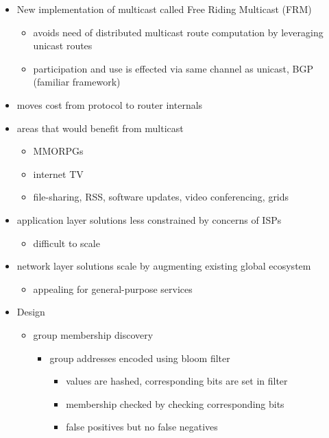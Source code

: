\begin{itemize}
    \item New implementation of multicast called Free Riding Multicast (FRM)
    \begin{itemize}
        \item avoids need of distributed multicast route computation by
        leveraging unicast routes
        \item participation and use is effected via same channel as unicast, BGP
        (familiar framework)
    \end{itemize}
    \item moves cost from protocol to router internals
    \item areas that would benefit from multicast
    \begin{itemize}
        \item MMORPGs
        \item internet TV
        \item file-sharing, RSS, software updates, video conferencing, grids
    \end{itemize}
    \item application layer solutions less constrained by concerns of ISPs
    \begin{itemize}
        \item difficult to scale
    \end{itemize}
    \item network layer solutions scale by augmenting existing global ecosystem
    \begin{itemize}
        \item appealing for general-purpose services
    \end{itemize}
    \item Design
    \begin{itemize}
        \item group membership discovery
        \begin{itemize}
            \item group addresses encoded using bloom filter
            \begin{itemize}
                \item values are hashed, corresponding bits are set in filter
                \item membership checked by checking corresponding bits
                \item false positives but no false negatives

\end{itemize}
\end{itemize}
\end{itemize}
\end{itemize}

